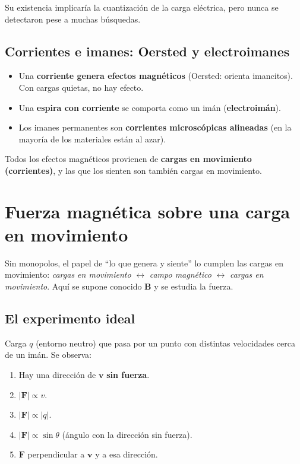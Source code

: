 \documentclass[12pt,a4paper]{article}
\begin{document}
\begin{notebox}[Curiosidad]
  Su existencia implicaría la cuantización de la carga eléctrica, pero
  nunca se detectaron pese a muchas búsquedas.
\end{notebox}



\subsection{Corrientes e imanes: Oersted y electroimanes}

\begin{itemize}[nosep]
  \item Una \textbf{corriente genera efectos magnéticos} (Oersted:
        orienta imancitos). Con cargas quietas, no hay efecto.
  \item Una \textbf{espira con corriente} se comporta como un imán
        (\textbf{electroimán}).
  \item Los imanes permanentes son \textbf{corrientes microscópicas
        alineadas} (en la mayoría de los materiales están al azar).
\end{itemize}

Todos los efectos magnéticos provienen de \textbf{cargas en movimiento
(corrientes)}, y las que los sienten son también cargas en movimiento.



\section{Fuerza magnética sobre una carga en movimiento}

Sin monopolos, el papel de \enquote{lo que genera y siente} lo cumplen
las cargas en movimiento: \emph{cargas en movimiento} $\leftrightarrow$
\emph{campo magnético} $\leftrightarrow$ \emph{cargas en movimiento}.
Aquí se supone conocido $\mathbf{B}$ y se estudia la fuerza.

\subsection{El experimento ideal}

Carga $q$ (entorno neutro) que pasa por un punto con distintas
velocidades cerca de un imán. Se observa:
\begin{enumerate}[nosep]
  \item Hay una dirección de $\mathbf{v}$ \textbf{sin fuerza}.
  \item $|\mathbf{F}| \propto v$.
  \item $|\mathbf{F}| \propto |q|$.
  \item $|\mathbf{F}| \propto \sin\theta$ (ángulo con la dirección sin
        fuerza).
  \item $\mathbf{F}$ perpendicular a $\mathbf{v}$ y a esa dirección.
\end{enumerate}
\end{document}
